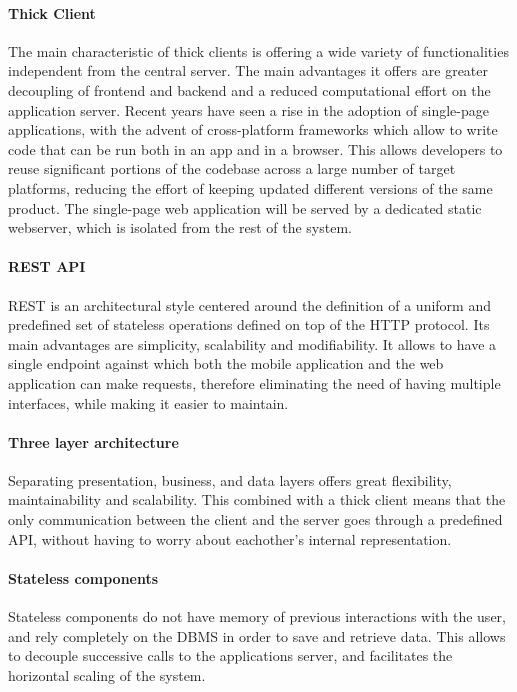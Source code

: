 \paragraph{Thick Client}
The main characteristic of thick clients is offering a wide variety of functionalities independent from the central server.
The main advantages it offers are greater decoupling of frontend and backend and a reduced computational effort on the application server.
Recent years have seen a rise in the adoption of single-page applications, with the advent of cross-platform frameworks which allow to write code that can be run both in an app and in a browser.
This allows developers to reuse significant portions of the codebase across a large number of target platforms, reducing the effort of keeping updated different versions of the same product.
The single-page web application will be served by a dedicated static webserver, which is isolated from the rest of the system.

\paragraph{REST API}
REST is an architectural style centered around the definition of a uniform and predefined set of stateless operations defined on top of the HTTP protocol.
Its main advantages are simplicity, scalability and modifiability.
It allows to have a single endpoint against which both the mobile application and the web application can make requests, therefore eliminating the need of having multiple interfaces, while making it easier to maintain.

\paragraph{Three layer architecture}
Separating presentation, business, and data layers offers great flexibility, maintainability and scalability.
This combined with a thick client means that the only communication between the client and the server goes through a predefined API, without having to worry about eachother's internal representation.

\paragraph{Stateless components}
Stateless components do not have memory of previous interactions with the user, and rely completely on the DBMS in order to save and retrieve data. This allows to decouple successive calls to the applications server, and facilitates the horizontal scaling of the system.

